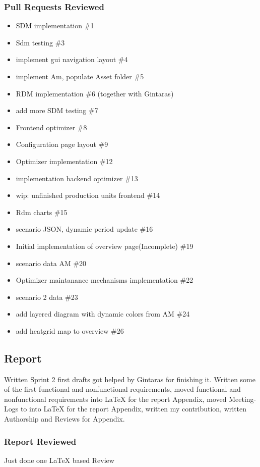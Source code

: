 \subsubsection*{Pull Requests Reviewed}
\begin{itemize}
    \item SDM implementation \#1
    \item Sdm testing \#3
    \item implement gui navigation layout \#4
    \item implement Am, populate Asset folder \#5
    \item RDM implementation \#6 (together with Gintaras)
    \item add more SDM testing \#7
    \item Frontend optimizer \#8
    \item Configuration page layout \#9
    \item Optimizer implementation \#12
    \item implementation backend optimizer \#13
    \item wip: unfinished production units frontend \#14 
    \item Rdm charts \#15
    \item scenario JSON, dynamic period update \#16
    \item Initial implementation of overview page(Incomplete) \#19
    \item scenario data AM \#20
    \item Optimizer maintanance mechanisms implementation \#22
    \item scenario 2 data \#23
    \item add layered diagram with dynamic colors from AM \#24
    \item add heatgrid map to overview \#26

\end{itemize}
\subsection*{Report}
Written Sprint 2 first drafts got helped by Gintaras for finishing it. Written some of the first functional and nonfunctional requirements, moved functional and nonfunctional requirements into LaTeX for the report Appendix, moved Meeting-Logs to into LaTeX for the report Appendix, written my contribution, written Authorship and Reviews for Appendix. 
\subsubsection*{Report Reviewed}
Just done one LaTeX based Review
